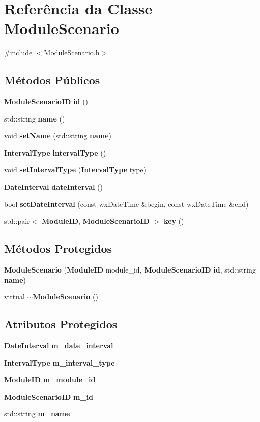 \section{Referência da Classe Module\+Scenario}
\label{class_module_scenario}


{\ttfamily \#include $<$Module\+Scenario.\+h$>$}

\subsection*{Métodos Públicos}
\begin{DoxyCompactItemize}
\item 
{\bf Module\+Scenario\+ID} {\bf id} ()
\item 
std\+::string {\bf name} ()
\item 
void {\bf set\+Name} (std\+::string {\bf name})
\item 
{\bf Interval\+Type} {\bf interval\+Type} ()
\item 
void {\bf set\+Interval\+Type} ({\bf Interval\+Type} type)
\item 
{\bf Date\+Interval} {\bf date\+Interval} ()
\item 
bool {\bf set\+Date\+Interval} (const wx\+Date\+Time \&begin, const wx\+Date\+Time \&end)
\item 
std\+::pair$<$ {\bf Module\+ID}, {\bf Module\+Scenario\+ID} $>$ {\bf key} ()
\end{DoxyCompactItemize}
\subsection*{Métodos Protegidos}
\begin{DoxyCompactItemize}
\item 
{\bf Module\+Scenario} ({\bf Module\+ID} module\+\_\+id, {\bf Module\+Scenario\+ID} {\bf id}, std\+::string {\bf name})
\item 
virtual {\bf $\sim$\+Module\+Scenario} ()
\end{DoxyCompactItemize}
\subsection*{Atributos Protegidos}
\begin{DoxyCompactItemize}
\item 
{\bf Date\+Interval} {\bf m\+\_\+date\+\_\+interval}
\item 
{\bf Interval\+Type} {\bf m\+\_\+interval\+\_\+type}
\item 
{\bf Module\+ID} {\bf m\+\_\+module\+\_\+id}
\item 
{\bf Module\+Scenario\+ID} {\bf m\+\_\+id}
\item 
std\+::string {\bf m\+\_\+name}
\end{DoxyCompactItemize}


